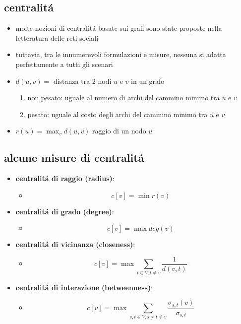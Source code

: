 
\subsection*{centralit\'a}
\begin{flushleft}
	\begin{itemize}
		\item molte nozioni di centralit\'a basate sui grafi sono state proposte nella letteratura delle reti sociali
		\item tuttavia, tra le innumerevoli formulazioni e misure, nessuna si adatta perfettamente a tutti gli scenari
		\item $d(u,v)=$ distanza tra 2 nodi $u$ e $v$ in un grafo
		\begin{enumerate}
			\item non pesato: uguale al numero di archi del cammino minimo tra $u$ e $v$
			\item pesato: uguale al costo degli archi del cammino minimo tra $u$ e $v$
		\end{enumerate}
		\item $r(u)=\max_vd(u,v)$ raggio di un nodo $u$
	\end{itemize}
\end{flushleft}


\subsection*{alcune misure di centralit\'a}
\begin{flushleft}
	\begin{itemize}
		\item \textbf{centralit\'a di raggio (radius)}:
		\begin{itemize}
			\item[] $$c[v]=\min r(v)$$
		\end{itemize}
		\item \textbf{centralit\'a di grado (degree)}:
		\begin{itemize}
			\item[] $$c[v]=\max deg(v)$$
		\end{itemize}
		\item \textbf{centralit\'a di vicinanza (closeness)}:
		\begin{itemize}
			\item[] $$c[v]=\max\sum_{t\in V,t\neq v}\frac{1}{d(v,t)}$$
		\end{itemize}
		\item \textbf{centralit\'a di interazione (betweenness)}:
		\begin{itemize}
			\item[] $$c[v]=\max\sum_{s,t\in V,s\neq t\neq v}\frac{\sigma_{s,t}(v)}{\sigma_{s,t}}$$
		\end{itemize}
	\end{itemize}
\end{flushleft}

